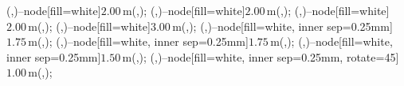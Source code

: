 {	\small

	 (\QQx,\Ay)--node[fill=white]{$2.00\,$m}(\QQx,\By);
	 (\QQx,\By)--node[fill=white]{$2.00\,$m}(\QQx,\Cy);
	 (\Qx,\Ey)--node[fill=white]{$2.00\,$m}(\Qx,\Dy);
	 (\Qx,\Dy)--node[fill=white]{$3.00\,$m}(\Qx,\Cy);
	 (\Ax,\Py)--node[fill=white, inner sep=0.25mm]{$1.75\,$m}(\Bx,\Py);
	 (\Bx,\Py)--node[fill=white, inner sep=0.25mm]{$1.75\,$m}(\Cx,\Py);
	 (\Cx,\Py)--node[fill=white, inner sep=0.25mm]{$1.50\,$m}(\Dx,\Py);
	 (\Dx,\Py)--node[fill=white, inner sep=0.25mm, rotate=45]{$1.00\,$m}(\Ex,\Py);



}

